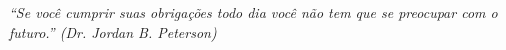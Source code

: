 \thispagestyle{empty}

\vspace*{\fill}
\begin{flushright}
	\begin{minipage}{8cm}
		\textit{
			“Se você cumprir suas obrigações todo dia você não tem que se preocupar com o futuro.”
			{(Dr. Jordan B. Peterson)}
		}
	\end{minipage}
\end{flushright}


